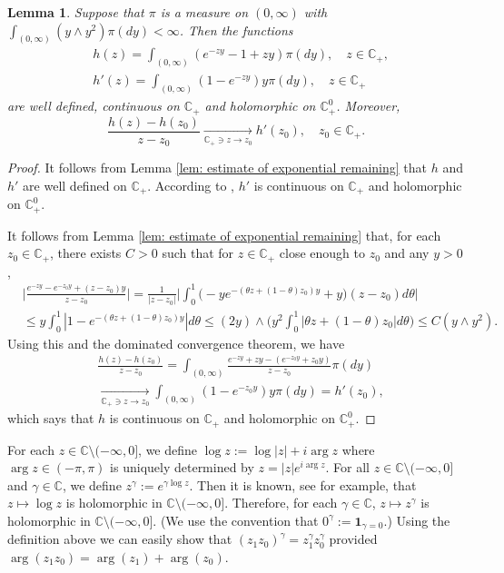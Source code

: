 \documentclass[12pt,a4paper]{amsart}
\theoremstyle{plain}
\newtheorem{lem}[thm]{Lemma}
\theoremstyle{definition}
\numberwithin{equation}{section}
\begin{document}
\begin{lem}
  \label{lem: extension lemma for branching mechanism}
  Suppose that  $\pi$ is a measure on $(0,\infty)$ with $\int_{(0,\infty)} (y \wedge y^2) \pi(dy)< \infty$.
  Then the functions
  \begin{align}
    & h (z)
      = \int_{(0,\infty)} (e^{-zy} - 1 + zy) \pi(dy), \quad z \in \mathbb C_+, \\
    & h'(z)
      = \int_{(0,\infty)}(1- e^{-zy})y \pi(dy), \quad z \in \mathbb C_+
  \end{align}
  are well defined, continuous on $\mathbb C_+$ and holomorphic on $\mathbb C_+^0$.
  Moreover,
  \[
    \frac{h(z)-h(z_0)}{z-z_0}
    \xrightarrow[\mathbb C_+\ni z \to z_0]{} h'(z_0),\quad z_0 \in \mathbb C_+.
  \]
\end{lem}
\begin{proof}
  It follows from Lemma \ref{lem: estimate of exponential remaining} that $h$ and $h'$ are well defined on $\mathbb C_+$.
  According to \cite[Theorems 3.2. \& Proposition 3.6]{SchillingSongVondravcek2010Bernstein}, $h'$ is continuous on $\mathbb C_+$ and holomorphic on $\mathbb C_+^0$.

  It follows from Lemma \ref{lem: estimate of exponential remaining} that, for each $z_0 \in \mathbb C_+$,  there exists $C>0$ such that for $z \in \mathbb C_+$ close enough to $z_0$ and any $y>0$,
  \begin{align}
    & \Big| \frac{e^{-zy} - e^{-z_0 y}+(z-z_0) y}{z-z_0} \Big|
      = \frac{1}{|z-z_0|}\Big| \int_0^1 \big(-y e^{-(\theta z+(1-\theta)z_0)y}+y\big)(z-z_0)d\theta\Big| \\
    & \leq y\int_0^1 |1-e^{-(\theta z +(1-\theta)z_0)y}| d\theta
      \leq (2y) \wedge\Big( y^2\int_0^1|\theta z+(1-\theta)z_0|d\theta\Big)
      \leq C(y\wedge y^2).
  \end{align}
  Using this and the dominated convergence theorem, we have
  \begin{align}
    & \frac{h(z)-h(z_0)}{z-z_0} = \int_{(0,\infty)} \frac{e^{-zy}+zy -(e^{-z_0 y}+z_0 y)}{z-z_0}  \pi(dy) \\
    & \xrightarrow[\mathbb C_+\ni z\to z_0]{} \int_{(0,\infty)}(1 - e^{-z_0 y} )y\pi(dy) = h'(z_0),
  \end{align}
  which says that $h$ is continuous on $\mathbb C_+$ and holomorphic on $\mathbb C_+^0$.
\end{proof}

For each $z\in \mathbb C\setminus (-\infty,0]$, we define $ \log z := \log |z| + i \arg z$ where $\arg z \in (-\pi,\pi)$ is uniquely determined by $ z = |z|e^{i \arg z}$. 	
For all $z\in \mathbb C\setminus (-\infty,0]$ and $\gamma \in \mathbb C$, we define $ z^\gamma := e^{\gamma \log z}. $
Then it is known, see \cite[Theorem 6.1]{SteinShakarchi2003Complex} for example, that $z\mapsto \log z$ is holomorphic in $\mathbb C\setminus (-\infty,0]$.
Therefore, for each $\gamma \in \mathbb C$, $z\mapsto z^\gamma$ is holomorphic in $\mathbb C\setminus (-\infty,0]$. (We use the convention that  $0^\gamma := \mathbf 1_{\gamma = 0}$.)
Using the definition above we can easily show that $(z_1z_0)^\gamma = z_1^\gamma z_0^\gamma$ provided $\arg (z_1z_0)=\arg (z_1) + \arg(z_0)$.
\end{document}
